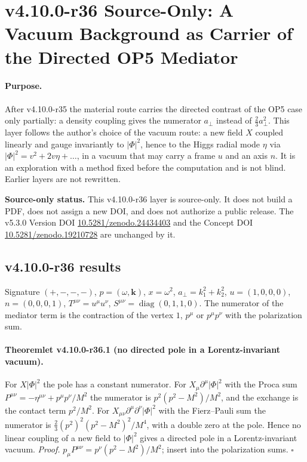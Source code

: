 \clearpage
\section*{v4.10.0-r36 Source-Only: A Vacuum Background as Carrier of the Directed OP5 Mediator}
\label{sec:v4100-r36-background-mediator}

\paragraph{Purpose.}
After v4.10.0-r35 the material route carries the directed contrast of the OP5 case only partially: a density coupling gives the numerator
\(a_\perp\) instead of \(\tfrac23a_\perp^2\).  This layer follows the author's choice of the vacuum route: a new field \(X\) coupled linearly and gauge
invariantly to \(|\Phi|^2\), hence to the Higgs radial mode \(\eta\) via \(|\Phi|^2=v^2+2v\eta+\dots\), in a vacuum that may carry a frame \(u\) and an axis
\(n\).  It is an exploration with a method fixed before the computation and is not blind.  Earlier layers are not rewritten.

\noindent\textbf{Source-only status.}
This v4.10.0-r36 layer is source-only.  It does not build a PDF, does not assign a new DOI,
and does not authorize a public release.  The v5.3.0 Version DOI
\href{https://doi.org/10.5281/zenodo.24434403}{10.5281/zenodo.24434403} and the Concept DOI
\href{https://doi.org/10.5281/zenodo.19210728}{10.5281/zenodo.19210728} are unchanged by it.

\subsection*{v4.10.0-r36 results}
\label{subsec:v4100-r36-results}

Signature \((+,-,-,-)\), \(p=(\omega,\mathbf k)\), \(x=\omega^2\), \(a_\perp=k_1^2+k_2^2\), \(u=(1,0,0,0)\), \(n=(0,0,0,1)\), \(T^{\mu\nu}=u^\mu u^\nu\),
\(S^{\mu\nu}=\operatorname{diag}(0,1,1,0)\).  The numerator of the mediator term is the contraction of the vertex \(1\), \(p^\mu\) or \(p^\mu p^\nu\) with the
polarization sum.

\paragraph{Theoremlet v4.10.0-r36.1 (no directed pole in a Lorentz-invariant vacuum).}
For \(X|\Phi|^2\) the pole has a constant numerator.  For \(X_\mu\partial^\mu|\Phi|^2\) with the Proca sum \(P^{\mu\nu}=-\eta^{\mu\nu}+p^\mu p^\nu/M^2\) the numerator is
\(p^2(p^2-M^2)/M^2\), and the exchange is the contact term \(p^2/M^2\).  For \(X_{\mu\nu}\partial^\mu\partial^\nu|\Phi|^2\) with the Fierz--Pauli sum the numerator is
\(\tfrac23(p^2)^2(p^2-M^2)^2/M^4\), with a double zero at the pole.  Hence no linear coupling of a new field to \(|\Phi|^2\) gives a directed pole in a
Lorentz-invariant vacuum.  \emph{Proof.} \(p_\mu P^{\mu\nu}=p^\nu(p^2-M^2)/M^2\); insert into the polarization sums.  \(\square\)

